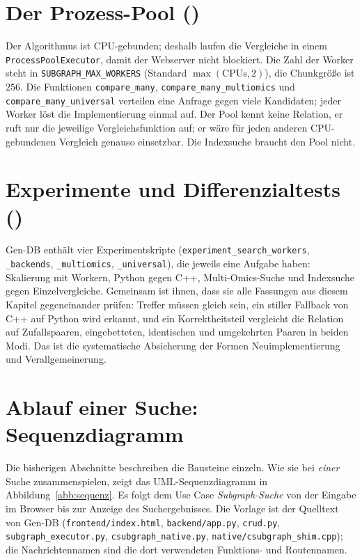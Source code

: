\section{Der Prozess-Pool ()}
\label{sec:pool}

Der Algorithmus ist CPU-gebunden; deshalb laufen die Vergleiche in einem \texttt{ProcessPoolExecutor}, damit der Webserver nicht blockiert. Die Zahl der Worker steht in \texttt{SUBGRAPH\_MAX\_WORKERS} (Standard $\max(\text{CPUs},2)$), die Chunkgröße ist $256$. Die Funktionen \texttt{compare\_many}, \texttt{compare\_many\_multiomics} und \texttt{compare\_many\_universal} verteilen eine Anfrage gegen viele Kandidaten; jeder Worker löst die Implementierung einmal auf. Der Pool kennt keine Relation, er ruft nur die jeweilige Vergleichsfunktion auf; er wäre für jeden anderen CPU-gebundenen Vergleich genauso einsetzbar. Die Indexsuche braucht den Pool nicht.

\section{Experimente und Differenzialtests ()}
\label{sec:gendb_experimente}

Gen-DB enthält vier Experimentskripte (\texttt{experiment\_search\_workers}, \texttt{\_backends}, \texttt{\_multiomics}, \texttt{\_universal}), die jeweils eine Aufgabe haben: Skalierung mit Workern, Python gegen C++, Multi-Omics-Suche und Indexsuche gegen Einzelvergleiche. Gemeinsam ist ihnen, dass sie alle Fassungen aus diesem Kapitel gegeneinander prüfen: Treffer müssen gleich sein, ein stiller Fallback von C++ auf Python wird erkannt, und ein Korrektheitsteil vergleicht die Relation auf Zufallspaaren, eingebetteten, identischen und umgekehrten Paaren in beiden Modi. Das ist die systematische Absicherung der Formen Neuimplementierung und Verallgemeinerung.

\section{Ablauf einer Suche: Sequenzdiagramm}
\label{sec:sequenz}

Die bisherigen Abschnitte beschreiben die Bausteine einzeln. Wie sie bei \emph{einer} Suche zusammenspielen, zeigt das UML-Sequenzdiagramm in Abbildung~\ref{abb:sequenz}. Es folgt dem Use Case \emph{Subgraph-Suche} von der Eingabe im Browser bis zur Anzeige des Suchergebnisses. Die Vorlage ist der Quelltext von Gen-DB (\texttt{frontend/index.html}, \texttt{backend/app.py}, \texttt{crud.py}, \texttt{subgraph\_executor.py}, \texttt{csubgraph\_native.py}, \texttt{native/csubgraph\_shim.cpp}); die Nachrichtennamen sind die dort verwendeten Funktions- und Routennamen.


